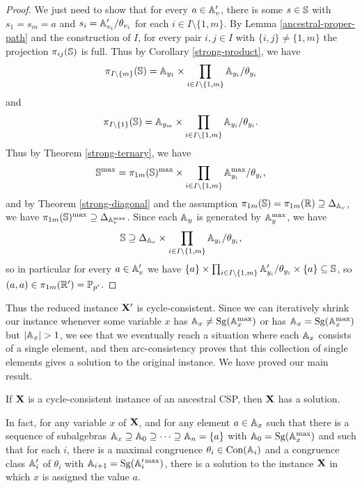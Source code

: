 \documentclass[letterpaper,11pt]{article}
\DeclareMathOperator{\Sg}{Sg}
\DeclareMathOperator{\Con}{Con}
\begin{document}
\begin{proof}
We just need to show that for every $a \in \mathbb{A}_v'$, there is some $s \in \mathbb{S}$ with $s_1 = s_m = a$ and $s_i = \mathbb{A}_{v_i}'/\theta_{v_i}$ for each $i \in I \setminus\{1,m\}$. By Lemma \ref{ancestral-proper-path} and the construction of $I$, for every pair $i,j \in I$ with $\{i,j\} \ne \{1,m\}$ the projection $\pi_{ij}(\mathbb{S})$ is full. Thus by Corollary \ref{strong-product}, we have
\[
\pi_{I\setminus\{m\}}(\mathbb{S}) = \mathbb{A}_{y_1} \times \prod_{i \in I \setminus\{1,m\}} \mathbb{A}_{y_i}/\theta_{y_i}
\]
and
\[
\pi_{I\setminus\{1\}}(\mathbb{S}) = \mathbb{A}_{y_m} \times \prod_{i \in I \setminus\{1,m\}} \mathbb{A}_{y_i}/\theta_{y_i}.
\]
Thus by Theorem \ref{strong-ternary}, we have
\[
\mathbb{S}^{\max} = \pi_{1m}(\mathbb{S})^{\max} \times \prod_{i \in I \setminus\{1,m\}} \mathbb{A}_{y_i}^{\max}/\theta_{y_i},
\]
and by Theorem \ref{strong-diagonal} and the assumption $\pi_{1m}(\mathbb{S}) = \pi_{1m}(\mathbb{R}) \supseteq \Delta_{\mathbb{A}_v}$, we have $\pi_{1m}(\mathbb{S})^{\max} \supseteq \Delta_{\mathbb{A}_v^{\max}}$. Since each $\mathbb{A}_y$ is generated by $\mathbb{A}_y^{\max}$, we have
\[
\mathbb{S} \supseteq \Delta_{\mathbb{A}_v} \times \prod_{i \in I \setminus\{1,m\}} \mathbb{A}_{y_i}/\theta_{y_i},
\]
so in particular for every $a \in \mathbb{A}_v'$ we have $\{a\} \times \prod_{i \in I \setminus\{1,m\}} \mathbb{A}_{y_i}'/\theta_{y_i} \times \{a\} \subseteq \mathbb{S}$, so $(a,a) \in \pi_{1m}(\mathbb{R}') = \mathbb{P}_{p'}$.
\end{proof}

Thus the reduced instance $\mathbf{X}'$ is cycle-consistent. Since we can iteratively shrink our instance whenever some variable $x$ has $\bA_x \ne \Sg(\bA_x^{\max})$ or has $\bA_x = \Sg(\bA_x^{\max})$ but $|\mathbb{A}_x| > 1$, we see that we eventually reach a situation where each $\mathbb{A}_x$ consists of a single element, and then arc-consistency proves that this collection of single elements gives a solution to the original instance. We have proved our main result.

\begin{thm} If $\mathbf{X}$ is a cycle-consistent instance of an ancestral CSP, then $\mathbf{X}$ has a solution.

In fact, for any variable $x$ of $\mathbf{X}$, and for any element $a \in \mathbb{A}_x$ such that there is a sequence of subalgebras $\mathbb{A}_x \supseteq \mathbb{A}_0 \supseteq \cdots \supseteq \mathbb{A}_n = \{a\}$ with $\bA_0 = \Sg(\bA_x^{\max})$ and such that for each $i$, there is a maximal congruence $\theta_i \in \Con(\bA_i)$ and a congruence class $\mathbb{A}_i'$ of $\theta_i$ with $\bA_{i+1} = \Sg(\bA_i'^{\max})$, there is a solution to the instance $\mathbf{X}$ in which $x$ is assigned the value $a$.
\end{thm}
\end{document}
